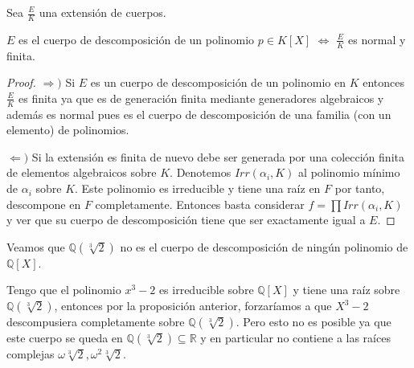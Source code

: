 \begin{proposition}
Sea $\frac{E}{K}$ una extensión de cuerpos. 

$E$ es el cuerpo de descomposición de un polinomio $p \in K[X]$ $\iff$ $\frac{E}{K}$ es normal y finita.
\end{proposition}
\begin{proof}
$\Rightarrow)$ Si $E$ es un cuerpo de descomposición de un polinomio en $K$ entonces $\frac{E}{K}$ es finita ya que es de generación finita mediante generadores algebraicos y además es normal pues es el cuerpo de descomposición de una familia (con un elemento) de polinomios. 

$\Leftarrow)$ Si la extensión es finita de nuevo debe ser generada por una colección finita de elementos algebraicos sobre $K$. Denotemos $Irr(\alpha_i,K)$ al polinomio mínimo de $\alpha_i$ sobre $K$. Este polinomio es irreducible y tiene una raíz en $F$ por tanto, descompone en $F$ completamente. Entonces basta considerar $f = \prod Irr(\alpha_i,K)$ y ver que su cuerpo de descomposición tiene que ser exactamente igual a $E$.
\end{proof}

\begin{example}
	Veamos que $\mathbb{Q}(\sqrt[3]{2})$ no es el cuerpo de descomposición de ningún
	polinomio de $\mathbb{Q}[X]$.
	
	Tengo que el polinomio $x^3-2$ es irreducible sobre $\mathbb{Q}[X]$ y tiene una raíz sobre $\mathbb{Q}(\sqrt[3]{2})$, entonces por la proposición anterior, forzaríamos a que $X^3-2$ descompusiera completamente sobre $\mathbb{Q}(\sqrt[3]{2})$. Pero esto no es posible ya que este cuerpo se queda en $\mathbb{Q}(\sqrt[3]{2}) \subseteq \mathbb{R}$ y en particular no contiene a las raíces complejas $\omega \sqrt[3]{2},\omega^2 \sqrt[3]{2}$.
\end{example}

